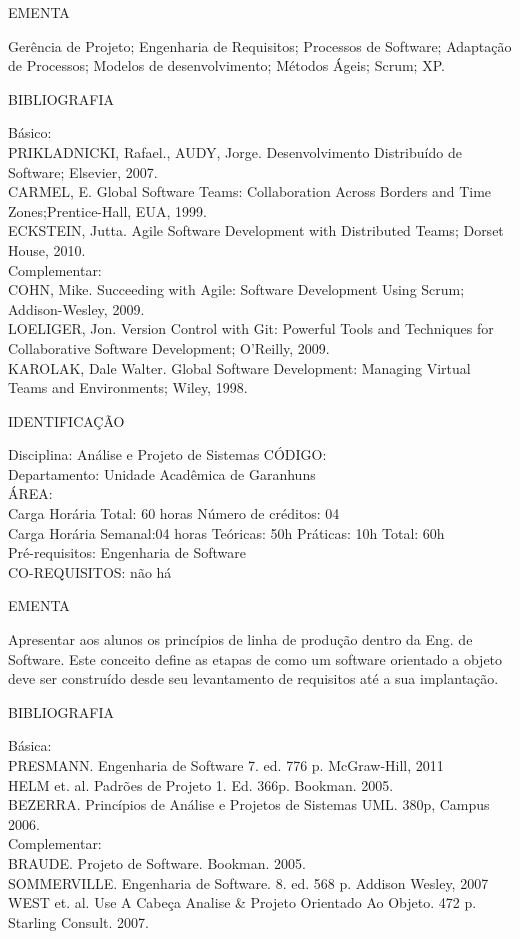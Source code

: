 \documentclass[
	12pt,				%
	openright,			%
  oneside,     %
	a4paper,			%
	chapter=TITLE,		%
	english,			%
	french,				%
	spanish,			%
	brazil				%
	]{abntex2}
\begin{document}
\begin{apendicesenv}
EMENTA 

Gerência de Projeto; Engenharia de Requisitos; Processos de Software; Adaptação de Processos; Modelos de desenvolvimento; Métodos Ágeis; Scrum; XP.

BIBLIOGRAFIA 

Básico:\\
PRIKLADNICKI, Rafael., AUDY, Jorge. Desenvolvimento Distribuído de
Software; Elsevier, 2007.\\
CARMEL, E. Global Software Teams: Collaboration Across Borders and Time
Zones;Prentice-Hall, EUA, 1999.\\
ECKSTEIN, Jutta. Agile Software Development with Distributed Teams;
Dorset House, 2010.\\
Complementar:\\
COHN, Mike. Succeeding with Agile: Software Development Using Scrum;
Addison-Wesley, 2009.\\
LOELIGER, Jon. Version Control with Git: Powerful Tools and Techniques
for Collaborative Software Development; O'Reilly,
2009.\\
KAROLAK, Dale Walter. Global Software Development: Managing Virtual
Teams and Environments; Wiley, 1998.

\newpage IDENTIFICAÇÃO

Disciplina: Análise e Projeto de Sistemas CÓDIGO:\\ 
Departamento: Unidade Acadêmica de Garanhuns\\
ÁREA: \\
Carga Horária Total: 60 horas Número de créditos: 04\\
Carga Horária Semanal:04 horas Teóricas: 50h Práticas: 10h Total: 60h\\
Pré-requisitos: Engenharia de Software\\
CO-REQUISITOS: não há

EMENTA 

Apresentar aos alunos os princípios de linha de produção dentro da Eng. de Software. Este conceito define as etapas de como um software orientado a objeto deve ser construído desde seu levantamento de requisitos até a sua implantação.

BIBLIOGRAFIA 

Básica:\\
PRESMANN. Engenharia de Software 7. ed. 776 p. McGraw-Hill, 2011\\
HELM et. al. Padrões de Projeto 1. Ed. 366p. Bookman. 2005.\\
BEZERRA. Princípios de Análise e Projetos de Sistemas UML. 380p, Campus 2006.\\
Complementar:\\
BRAUDE. Projeto de Software. Bookman. 2005.\\
SOMMERVILLE. Engenharia de Software. 8. ed. 568 p. Addison Wesley, 2007\\
WEST et. al. Use A Cabeça Analise \& Projeto Orientado Ao Objeto. 472 p.
Starling Consult. 2007.


\end{apendicesenv}
\end{document}
